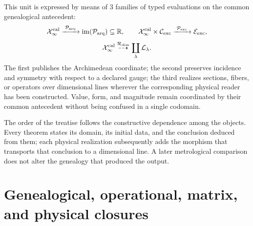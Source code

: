 This unit is expressed by means of \(3\) families of typed evaluations on
the common genealogical antecedent:
\[
 \mathcal X_\infty^{\rm cal}
 \xrightarrow{\;\mathcal P_{\rm arq}\;}
 \operatorname{im}(\mathcal P_{\rm arq})\subseteq\mathbb R,
 \qquad
 \mathcal X_\infty^{\rm cal}\times\mathcal C_{\rm exc}
 \xrightarrow{\;\mathcal P_{\rm exc}\;}
 \mathcal E_{\rm exc},
\]
\[
 \mathcal X_\infty^{\rm cal}
 \overset{\mathcal R_{\rm dim}}{\dashrightarrow}
 \coprod_{\lambda}\mathcal L_\lambda .
\]
The first publishes the Archimedean coordinate; the second preserves
incidence and symmetry with respect to a declared gauge; the third realizes
sections, fibers, or operators over dimensional lines wherever the corresponding physical reader has been constructed. Value, form, and magnitude remain
coordinated by their common antecedent without being confused in a single codomain.

The order of the treatise follows the constructive dependence among the objects. Every theorem states its domain, its initial data, and the conclusion deduced from them; each physical realization subsequently adds the morphism that transports that conclusion to a dimensional line. A later metrological comparison does not alter the genealogy that produced the output.

\section*{Genealogical, operational, matrix, and physical closures}

